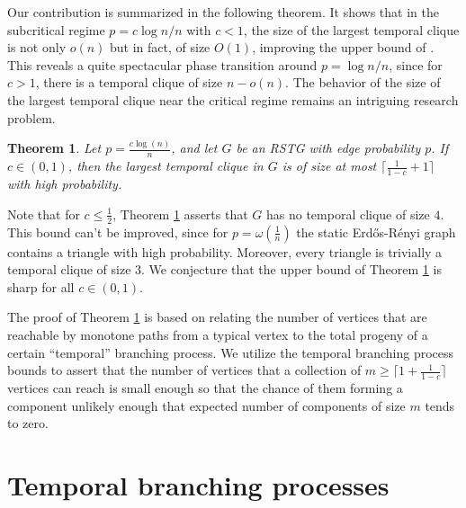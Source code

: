 \documentclass[11pt]{article}
\newtheorem{theorem}{Theorem}[]
\newcommand{\1}{\mathbf{1}} %
\begin{document}
Our contribution is summarized in the following theorem.
It shows that in the subcritical regime $p= c\log n/n$ with $c<1$,
the size of the largest temporal clique is not only $o(n)$ but in fact, of size $O(1)$,
improving the upper bound of \cite{Becker2023}. This reveals a quite spectacular
phase transition around $p= \log n/n$, since for $c>1$, there is a temporal clique
of size $n-o(n)$. The behavior of the size of the largest temporal clique near the critical
regime remains an intriguing research problem.

\begin{theorem}\label{main}
Let $p = \frac{c\log(n)}{n}$, and let $G$ be an RSTG with edge probability $p$. If $c \in (0,1)$, then the largest temporal clique in $G$ is of size at most $\lceil \frac{1}{1-c}+1 \rceil$ with high probability.
\end{theorem}

Note that for $c \leq \frac{1}{2}$, Theorem \ref{main} asserts that $G$ has
no temporal clique of size $4$. This bound can't be improved, since 
for $p = \omega(\frac{1}{n})$ the static Erd\H{o}s-R\'{e}nyi graph contains a triangle with high probability. Moreover, every triangle is trivially a temporal clique of size $3$.
We conjecture that the upper bound of Theorem \ref{main} is sharp for all $c\in (0,1)$.

The proof of Theorem \ref{main} is based on relating the number of vertices that are reachable by monotone paths from a typical vertex to the total progeny of a certain ``temporal'' branching process.
We utilize the temporal branching process bounds to assert that the number of vertices that a collection of $m \geq \lceil 1 + \frac{1}{1-c}\rceil$ vertices can reach is small enough so that the chance of them forming a component unlikely enough that expected number of components of size $m$ tends to zero.

\section{Temporal branching processes}\label{temptree}
\end{document}
